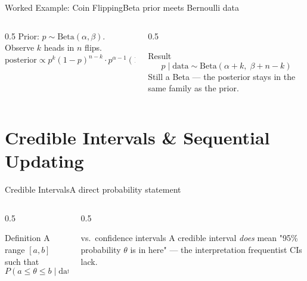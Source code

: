 \documentclass[aspectratio=169,11pt]{beamer}
\begin{document}
\begin{frame}{Worked Example: Coin Flipping}{Beta prior meets Bernoulli data}
  \begin{columns}[T]
    \begin{column}{0.5\textwidth}
      \small Prior: $p \sim \text{Beta}(\alpha,\beta)$. Observe $k$ heads in
      $n$ flips.
      \[ \text{posterior} \propto p^k(1-p)^{n-k}\cdot p^{\alpha-1}(1-p)^{\beta-1} \]
    \end{column}
    \begin{column}{0.5\textwidth}
      \begin{exampleblock}{Result}
        \[ p \mid \text{data} \sim \text{Beta}(\alpha+k,\; \beta+n-k) \]
        \small Still a Beta — the posterior stays in the same family as the
        prior.
      \end{exampleblock}
    \end{column}
  \end{columns}
  \vfill
  \centering
\end{frame}

\section{Credible Intervals \& Sequential Updating}

\begin{frame}{Credible Intervals}{A direct probability statement}
  \begin{columns}[T]
    \begin{column}{0.5\textwidth}
      \begin{block}{Definition}
        \small A range $[a,b]$ such that
        \[ P(a \le \theta \le b \mid \text{data}) = 0.95 \]
      \end{block}
    \end{column}
    \begin{column}{0.5\textwidth}
      \begin{exampleblock}{vs.\ confidence intervals}
        \small A credible interval \emph{does} mean "95\% probability
        $\theta$ is in here" — the interpretation frequentist CIs lack.
      \end{exampleblock}
    \end{column}
  \end{columns}
\end{frame}
\end{document}
